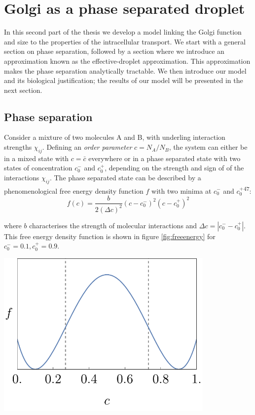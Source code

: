 \documentclass{Dissertate}
\let\origfigure\figure
\let\endorigfigure\endfigure
\renewenvironment{figure}[1][2] {
    \expandafter\origfigure\expandafter[H]
} {
    \endorigfigure
}
\begin{document}
\hypertarget{Golgi-as-a-phase-separated-droplet}{%
\chapter{Golgi as a phase separated
droplet}\label{Golgi-as-a-phase-separated-droplet}}

In this second part of the thesis we develop a model linking the Golgi
function and size to the properties of the intracellular transport. We
start with a general section on phase separation, followed by a section
where we introduce an approximation known as the
effective-droplet approximation. This approximation makes the phase separation analytically tractable. We then introduce our model and its biological justification; the results of our model will be presented in the next section.

\hypertarget{phase-separation}{%
\section{Phase separation}\label{phase-separation}}

Consider a mixture of two molecules A and B, with underling
interaction strengths \(\chi_{ij}\). Defining an \emph{order parameter}
\(c=N_A/N_B\), the system can either be in a mixed state with $c=\bar{c}$ everywhere or in a phase separated state with two states of concentration $c_0^-$ and $c_0^+$, depending on the strength and sign of 
of the interactions $\chi_{ij}$. The phase separated state can be described by a phenomenological free energy density function $f$ with two minima at $c_0^-$ and $c_0^+$\textsuperscript{47}:
\[
f(c) = \frac{b}{2(\Delta c)^2}(c-c_0^-)^2(c-c_0^+)^2
\]

where \(b\) characterises the strength of molecular interactions and
\(\Delta c = |c_0^--c_0^+|\). This free energy density function is shown in figure \ref{fig:freeenergy} for $c_0^-=0.1, c_0^+=0.9$.

\begin{figure}
	\centering
	\includegraphics[width=0.8\textwidth]{source/figures/pdf/Freeenergydensity.pdf}
	\caption{Phenomenological free energy density with minima at $c_0^-$ and $c_0^+$.}
	\label{fig:freeenergy}
\end{figure}
\end{document}
